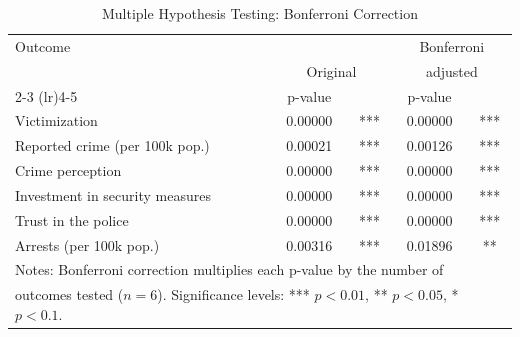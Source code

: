 \begin{table}[H]
\centering
\caption{Multiple Hypothesis Testing: Bonferroni Correction}
\label{tab:bonferroni}
\begin{tabular}{lcccc}
\toprule
Outcome & \multicolumn{2}{c}{} & \multicolumn{2}{c}{Bonferroni} \\
 & \multicolumn{2}{c}{Original} & \multicolumn{2}{c}{adjusted} \\
\cmidrule(lr){2-3} \cmidrule(lr){4-5}
 & p-value & & p-value & \\
\midrule
Victimization & 0.00000 & *** & 0.00000 & *** \\
Reported crime (per 100k pop.) & 0.00021 & *** & 0.00126 & *** \\
Crime perception & 0.00000 & *** & 0.00000 & *** \\
Investment in security measures & 0.00000 & *** & 0.00000 & *** \\
Trust in the police & 0.00000 & *** & 0.00000 & *** \\
Arrests (per 100k pop.) & 0.00316 & *** & 0.01896 & ** \\
\midrule
\multicolumn{5}{l}{\footnotesize Notes: Bonferroni correction multiplies each p-value by the number of} \\
\multicolumn{5}{l}{\footnotesize outcomes tested ($n=6$). Significance levels: *** $p<0.01$, ** $p<0.05$, * $p<0.1$.}
\end{tabular}
\end{table}